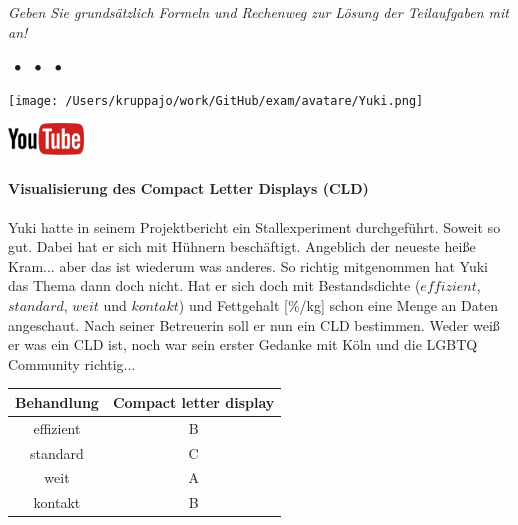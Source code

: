 \documentclass[a4paper, 9pt]{scrartcl}\usepackage[]{graphicx}\usepackage[]{xcolor}
\newenvironment{knitrout}{}{} %
\begin{document}
\textit{Geben Sie grundsätzlich Formeln und Rechenweg zur Lösung der Teilaufgaben mit an!} \\[1Ex]
 

 
\ifcollection
\begin{flushright}
\tiny\vspace{-3Ex}
\textbf{\examinhaltstart}
\exammodulestat $\;\bullet$
\exammodulestatbbv $\;\bullet$
\exammodulestatversuch $\;\bullet$
\exammodulebiostat
\vspace{-4Ex}
\end{flushright}
\begin{minipage}[t]{0.5\textwidth}
\texttt{[image: /Users/kruppajo/work/GitHub/exam/avatare/Yuki.png]}
\end{minipage}
\begin{minipage}[t]{0.5\textwidth}
\hfill
\href{https://youtu.be/xq29O8qDrg0}{\includegraphics[width = 2cm]{img/youtube}}
\end{minipage}
\vspace{-3ex}
\fi



\ifcollection
\paragraph{Visualisierung des Compact Letter Displays (CLD)}
\fi

Yuki hatte in seinem Projektbericht ein Stallexperiment durchgeführt. Soweit so gut. Dabei hat er sich mit Hühnern beschäftigt. Angeblich der neueste heiße Kram... aber das ist wiederum was anderes. So richtig mitgenommen hat Yuki das Thema dann doch nicht. Hat er sich doch mit Bestandsdichte ($effizient$, $standard$, $weit$ und $kontakt$) und Fettgehalt [\%/kg] schon eine Menge an Daten angeschaut. Nach seiner Betreuerin soll er nun ein CLD bestimmen. Weder weiß er was ein CLD ist, noch war sein erster Gedanke mit Köln und die LGBTQ Community richtig...

\begin{knitrout}
\color{fgcolor}\begin{table}[!h]
\centering\begingroup\fontsize{10}{12}\selectfont

\begin{tabular}{cc}
\toprule
\textbf{Behandlung} & \textbf{Compact letter display}\\
\midrule
effizient & B\\
standard & C\\
weit & A\\
kontakt & B\\
\bottomrule
\end{tabular}
\endgroup{}
\end{table}

\end{knitrout}
\end{document}
